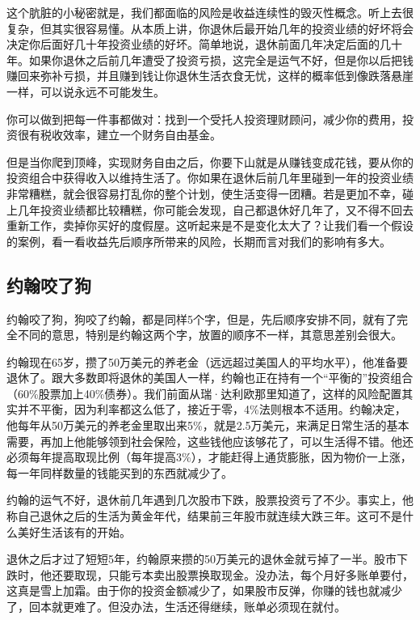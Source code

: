 这个肮脏的小秘密就是，我们都面临的风险是收益连续性的毁灭性概念。听上去很复杂，但其实很容易懂。从本质上讲，你退休后最开始几年的投资业绩的好坏将会决定你后面好几十年投资业绩的好坏。简单地说，退休前面几年决定后面的几十年。如果你退休之后前几年遭受了投资亏损，这完全是运气不好，但是你以后把钱赚回来弥补亏损，并且赚到钱让你退休生活衣食无忧，这样的概率低到像跌落悬崖一样，可以说永远不可能发生。

你可以做到把每一件事都做对：找到一个受托人投资理财顾问，减少你的费用，投资很有税收效率，建立一个财务自由基金。

但是当你爬到顶峰，实现财务自由之后，你要下山就是从赚钱变成花钱，要从你的投资组合中获得收入以维持生活了。你如果在退休后前几年里碰到一年的投资业绩非常糟糕，就会很容易打乱你的整个计划，使生活变得一团糟。若是更加不幸，碰上几年投资业绩都比较糟糕，你可能会发现，自己都退休好几年了，又不得不回去重新工作，卖掉你买好的度假屋。这听起来是不是变化太大了？让我们看一个假设的案例，看一看收益先后顺序所带来的风险，长期而言对我们的影响有多大。

\subsection{约翰咬了狗}

约翰咬了狗，狗咬了约翰，都是同样5个字，但是，先后顺序安排不同，就有了完全不同的意思，特别是约翰这两个字，放置的顺序不一样，其意思差别会很大。

约翰现在65岁，攒了50万美元的养老金（远远超过美国人的平均水平），他准备要退休了。跟大多数即将退休的美国人一样，约翰也正在持有一个“平衡的”投资组合（60\%股票加上40\%债券）。我们前面从瑞·达利欧那里知道了，这样的风险配置其实并不平衡，因为利率都这么低了，接近于零，4\%法则根本不适用。约翰决定，他每年从50万美元的养老金里取出来5\%，就是2.5万美元，来满足日常生活的基本需要，再加上他能够领到社会保险，这些钱他应该够花了，可以生活得不错。他还必须每年提高取现比例（每年提高3\%），才能赶得上通货膨胀，因为物价一上涨，每一年同样数量的钱能买到的东西就减少了。

约翰的运气不好，退休前几年遇到几次股市下跌，股票投资亏了不少。事实上，他称自己退休之后的生活为黄金年代，结果前三年股市就连续大跌三年。这可不是什么美好生活该有的开始。

退休之后才过了短短5年，约翰原来攒的50万美元的退休金就亏掉了一半。股市下跌时，他还要取现，只能亏本卖出股票换取现金。没办法，每个月好多账单要付，这真是雪上加霜。由于你的投资金额减少了，如果股市反弹，你赚的钱也就减少了，回本就更难了。但没办法，生活还得继续，账单必须现在就付。



